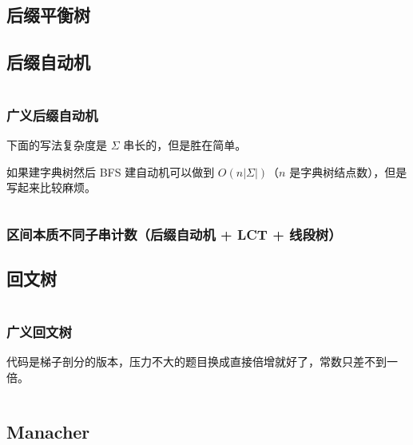 \documentclass[a4paper, twoside]{article}
\begin{document}
\begin{multicols}{2}
			\subsection{后缀平衡树}
				

			\subsection[后缀自动机 SAM]{后缀自动机}
				\inputminted{cpp}{../src/string/后缀自动机.cpp}

				\subsubsection{广义后缀自动机}
				下面的写法复杂度是 $\Sigma$ 串长的，但是胜在简单。
				
				如果建字典树然后 BFS 建自动机可以做到 $O\left(n\left|\Sigma\right|\right)$（$n$ 是字典树结点数），但是写起来比较麻烦。
				\inputminted{cpp}{../src/string/广义后缀自动机.cpp}

				\subsubsection[区间本质不同子串计数]{区间本质不同子串计数（后缀自动机 + LCT + 线段树）}
					

			\subsection[回文树 PAM]{回文树}
				\inputminted{cpp}{../src/string/回文树.cpp}

				\subsubsection{广义回文树}
					代码是梯子剖分的版本，压力不大的题目换成直接倍增就好了，常数只差不到一倍。
					\inputminted{cpp}{../src/string/广义回文树.cpp}



			\subsection[Manacher 马拉车]{Manacher}
				\inputminted{cpp}{../src/string/manacher.cpp}
			

\end{multicols}
\end{document}
